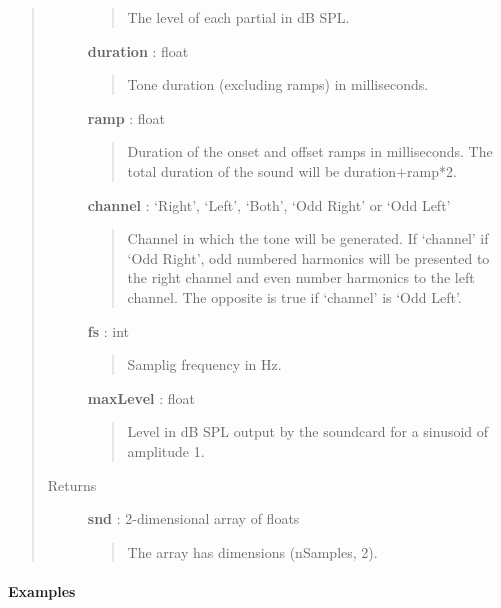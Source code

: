 \documentclass[a4paper,12pt,english]{sphinxmanual}
\begin{document}
\begin{fulllineitems}
\begin{quote}
\begin{description}
\begin{quote}
The level of each partial in dB SPL.
\end{quote}

\textbf{duration} : float
\begin{quote}

Tone duration (excluding ramps) in milliseconds.
\end{quote}

\textbf{ramp} : float
\begin{quote}

Duration of the onset and offset ramps in milliseconds.
The total duration of the sound will be duration+ramp*2.
\end{quote}

\textbf{channel} : `Right', `Left', `Both', `Odd Right' or `Odd Left'
\begin{quote}

Channel in which the tone will be generated. If `channel'
if `Odd Right', odd numbered harmonics will be presented
to the right channel and even number harmonics to the left
channel. The opposite is true if `channel' is `Odd Left'.
\end{quote}

\textbf{fs} : int
\begin{quote}

Samplig frequency in Hz.
\end{quote}

\textbf{maxLevel} : float
\begin{quote}

Level in dB SPL output by the soundcard for a sinusoid of amplitude 1.
\end{quote}

\item[{Returns }] \leavevmode
\textbf{snd} : 2-dimensional array of floats
\begin{quote}

The array has dimensions (nSamples, 2).
\end{quote}

\end{description}\end{quote}
\paragraph{Examples}


\end{fulllineitems}
\end{document}
